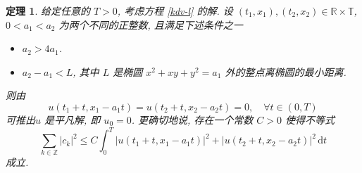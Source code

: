 \documentclass[master]{cugthesis}
\newcommand\R{\ensuremath{\mathbb{R}}}
\newcommand\Z{\ensuremath{\mathbb{Z}}}
\newcommand\T{\ensuremath{\mathbb{T}}}
\renewcommand\d{\ensuremath{\,\mathrm{d}}}
\newtheorem{theorem}{定理}[chapter]
\begin{document}
  \iffalse  \begin{theorem}
    给定任意的 $T>0$, 考虑方程 \eqref{kdv-l} 的解. 设 $(t_1,x_1), (t_2,x_2)\in \R\times \T$, $0<a_1<a_2$ 为两个不同的正整数, 且满足下述条件之一  
\begin{itemize}
    \item [\rm{(1)}] $a_2>4a_1$.
    \item [\rm{(2)}] $a_2-a_1<L$, 其中 $L$ 是椭圆 $x^2+xy+y^2=a_1$ 外的整点离椭圆的最小距离.
\end{itemize}
 则由 
    \begin{equation*}
        u(t_1+t,x_1-a_1t)=u(t_2+t,x_2-a_2t)=0,\quad \forall t\in (0,T)
    \end{equation*}
    可推出$u$ 是平凡解, 即 $u_0=0$. 更确切地说, 存在一个常数 $C>0$ 使得不等式
    \begin{equation}\label{3-2-10}
        \sum_{k\in\Z} |c_k|^2\le C\int_0^T|u(t_1+t,x_1-a_1t)|^2+|u(t_2+t,x_2-a_2t)|^2 \d t
    \end{equation}
    成立.
    \end{theorem}
\end{document}
